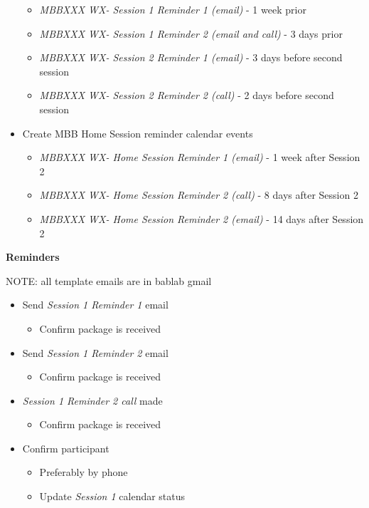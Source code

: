 \documentclass[]{book}
\providecommand{\tightlist}{%
  \setlength{\itemsep}{0pt}\setlength{\parskip}{0pt}}
\begin{document}
\begin{itemize}
  \begin{itemize}
  \tightlist
  \item
    \emph{MBBXXX WX- Session 1 Reminder 1 (email)} - 1 week prior
  \item
    \emph{MBBXXX WX- Session 1 Reminder 2 (email and call)} - 3 days prior
  \item
    \emph{MBBXXX WX- Session 2 Reminder 1 (email) } - 3 days before second session
  \item
    \emph{MBBXXX WX- Session 2 Reminder 2 (call)} - 2 days before second session
  \end{itemize}
\item
  Create MBB Home Session reminder calendar events

  \begin{itemize}
  \tightlist
  \item
    \emph{MBBXXX WX- Home Session Reminder 1 (email)} - 1 week after Session 2
  \item
    \emph{MBBXXX WX- Home Session Reminder 2 (call)} - 8 days after Session 2
  \item
    \emph{MBBXXX WX- Home Session Reminder 2 (email)} - 14 days after Session 2
  \end{itemize}
\end{itemize}

\textbf{Reminders}

NOTE: all template emails are in bablab gmail

\begin{itemize}
\tightlist
\item
  Send \emph{Session 1 Reminder 1} email

  \begin{itemize}
  \tightlist
  \item
    Confirm package is received
  \end{itemize}
\item
  Send \emph{Session 1 Reminder 2} email

  \begin{itemize}
  \tightlist
  \item
    Confirm package is received
  \end{itemize}
\item
  \emph{Session 1 Reminder 2 call} made

  \begin{itemize}
  \tightlist
  \item
    Confirm package is received
  \end{itemize}
\item
  Confirm participant

  \begin{itemize}
  \tightlist
  \item
    Preferably by phone
  \item
    Update \emph{Session 1} calendar status
  \end{itemize}
\end{itemize}
\end{document}
